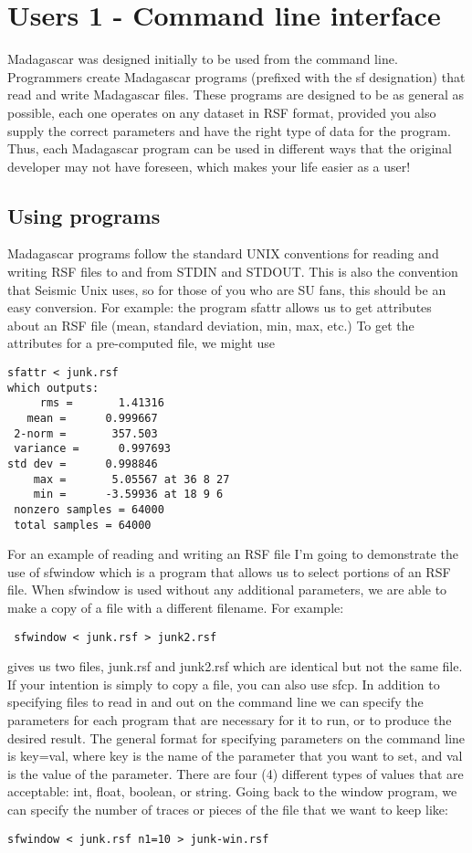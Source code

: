 \section{Users 1 - Command line interface}
Madagascar was designed initially to be used from the command line. Programmers create Madagascar programs (prefixed with the sf designation) that read and write Madagascar files. These programs are designed to be as general as possible, each one operates on any dataset in RSF format, provided you also supply the correct parameters and have the right type of data for the program. Thus, each Madagascar program can be used in different ways that the original developer may not have foreseen, which makes your life easier as a user!

\subsection{Using programs}
Madagascar programs follow the standard UNIX conventions for reading and writing RSF files to and from STDIN and STDOUT. This is also the convention that Seismic Unix uses, so for those of you who are SU fans, this should be an easy conversion.
For example: the program sfattr allows us to get attributes about an RSF file (mean, standard deviation, min, max, etc.) To get the attributes for a pre-computed file, we might use
\begin{verbatim}
sfattr < junk.rsf
which outputs:
     rms =       1.41316 
   mean =      0.999667 
 2-norm =       357.503 
 variance =      0.997693 
std dev =      0.998846 
    max =       5.05567 at 36 8 27 
    min =      -3.59936 at 18 9 6 
 nonzero samples = 64000 
 total samples = 64000 
 \end{verbatim}
For an example of reading and writing an RSF file I'm going to demonstrate the use of sfwindow which is a program that allows us to select portions of an RSF file. When sfwindow is used without any additional parameters, we are able to make a copy of a file with a different filename. For example:
\begin{verbatim}
 sfwindow < junk.rsf > junk2.rsf
 \end{verbatim}
gives us two files, junk.rsf and junk2.rsf which are identical but not the same file. If your intention is simply to copy a file, you can also use sfcp.
In addition to specifying files to read in and out on the command line we can specify the parameters for each program that are necessary for it to run, or to produce the desired result. The general format for specifying parameters on the command line is key=val, where key is the name of the parameter that you want to set, and val is the value of the parameter. There are four (4) different types of values that are acceptable: int, float, boolean, or string. Going back to the window program, we can specify the number of traces or pieces of the file that we want to keep like:
\begin{verbatim}
sfwindow < junk.rsf n1=10 > junk-win.rsf
\end{verbatim}

